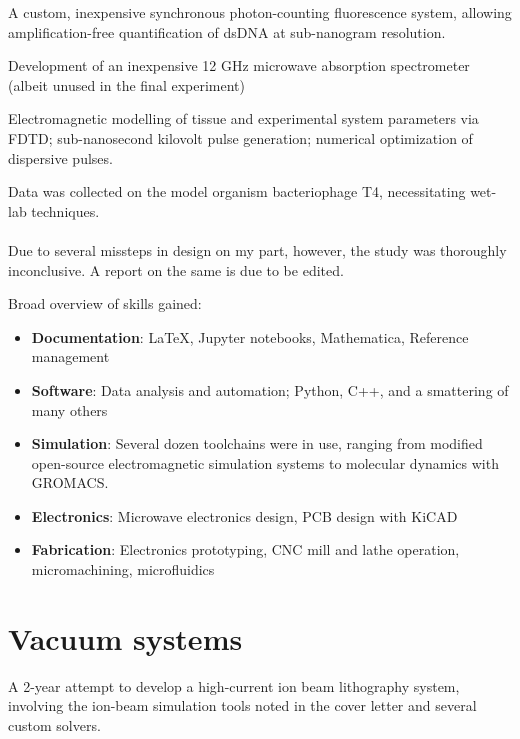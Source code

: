 \documentclass[fleqn,10pt]{article}
\begin{document}
{\begin{multicols}{1}
A custom, inexpensive synchronous photon-counting fluorescence system, allowing amplification-free quantification of dsDNA at sub-nanogram resolution.

Development of an inexpensive 12 GHz microwave absorption spectrometer (albeit unused in the final experiment)

Electromagnetic modelling of tissue and experimental system parameters via FDTD; sub-nanosecond kilovolt pulse generation; numerical optimization of dispersive pulses.

Data was collected on the model organism bacteriophage T4, necessitating wet-lab techniques.\\ \\ Due to several missteps in design on my part, however, the study was thoroughly inconclusive. A report on the same is due to be edited.


Broad overview of skills gained:
\begin{itemize}
	\item \textbf{Documentation}: LaTeX, Jupyter notebooks, Mathematica, Reference management
	\item \textbf{Software}: Data analysis and automation; Python, C++, and a smattering of many others
	\item \textbf{Simulation}: Several dozen toolchains were in use, ranging from modified open-source electromagnetic simulation systems to molecular dynamics with GROMACS.
	\item \textbf{Electronics}: Microwave electronics design, PCB design with KiCAD
	\item \textbf{Fabrication}: Electronics prototyping, CNC mill and lathe operation, micromachining, microfluidics
\end{itemize}


\section*{Vacuum systems}

A 2-year attempt to develop a high-current ion beam lithography system, involving the ion-beam simulation tools noted in the cover letter and several custom solvers.
	
\end{multicols}



\begin{figure}[H]
	\centering
	
\end{figure}}
\end{document}
